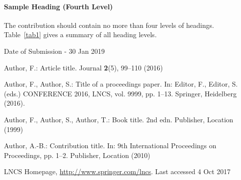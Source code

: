 \documentclass[runningheads]{llncs}
\begin{document}
\paragraph{Sample Heading (Fourth Level)}
The contribution should contain no more than four levels of
headings. Table~\ref{tab1} gives a summary of all heading levels.



Date of Submission - 30 Jan 2019





%
%
%
% 
% 
%
\begin{thebibliography}{8}
Author, F.: Article title. Journal \textbf{2}(5), 99--110 (2016)

Author, F., Author, S.: Title of a proceedings paper. In: Editor,
F., Editor, S. (eds.) CONFERENCE 2016, LNCS, vol. 9999, pp. 1--13.
Springer, Heidelberg (2016). 

Author, F., Author, S., Author, T.: Book title. 2nd edn. Publisher,
Location (1999)

Author, A.-B.: Contribution title. In: 9th International Proceedings
on Proceedings, pp. 1--2. Publisher, Location (2010)

LNCS Homepage, \url{http://www.springer.com/lncs}. Last accessed 4
Oct 2017
\end{thebibliography}
\end{document}
